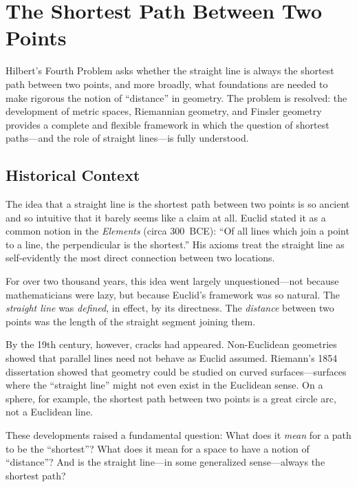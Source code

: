 
\chapter{The Shortest Path Between Two Points}

\begin{solvedbox}
Hilbert's Fourth Problem asks whether the straight line is always the shortest path between two points, and more broadly, what foundations are needed to make rigorous the notion of ``distance'' in geometry. The problem is resolved: the development of metric spaces, Riemannian geometry, and Finsler geometry provides a complete and flexible framework in which the question of shortest paths---and the role of straight lines---is fully understood.
\end{solvedbox}

\section{Historical Context}

The idea that a straight line is the shortest path between two points is so ancient and so intuitive that it barely seems like a claim at all. Euclid stated it as a common notion in the \emph{Elements} (circa 300~BCE): ``Of all lines which join a point to a line, the perpendicular is the shortest.'' His axioms treat the straight line as self-evidently the most direct connection between two locations.

For over two thousand years, this idea went largely unquestioned---not because mathematicians were lazy, but because Euclid's framework was so natural. The \emph{straight line} was \emph{defined}, in effect, by its directness. The \emph{distance} between two points was the length of the straight segment joining them.

By the 19th century, however, cracks had appeared. Non-Euclidean geometries showed that parallel lines need not behave as Euclid assumed. Riemann's 1854 dissertation showed that geometry could be studied on curved surfaces---surfaces where the ``straight line'' might not even exist in the Euclidean sense. On a sphere, for example, the shortest path between two points is a great circle arc, not a Euclidean line.

These developments raised a fundamental question: What does it \emph{mean} for a path to be the ``shortest''? What does it mean for a space to have a notion of ``distance''? And is the straight line---in some generalized sense---always the shortest path?

